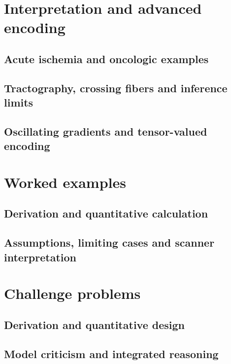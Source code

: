 \section{Interpretation and advanced encoding}
\label{sec:10:interpretation-and-advanced-encoding}
\subsection{Acute ischemia and oncologic examples}
\subsection{Tractography, crossing fibers and inference limits}
\subsection{Oscillating gradients and tensor-valued encoding}

\section{Worked examples}
\label{sec:10:worked-examples}
\subsection{Derivation and quantitative calculation}
\subsection{Assumptions, limiting cases and scanner interpretation}

\section{Challenge problems}
\label{sec:10:challenge-problems}
\subsection{Derivation and quantitative design}
\subsection{Model criticism and integrated reasoning}
